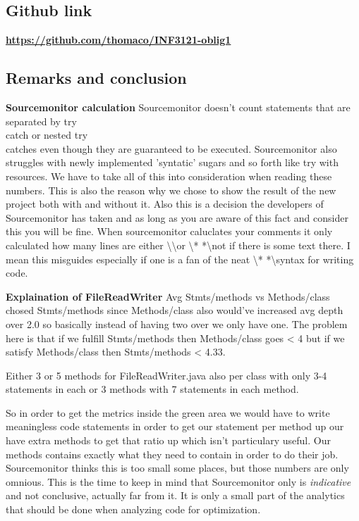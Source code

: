 \documentclass{article}
\begin{document}
\subsection{Github link}
\href{https://github.com/thomaco/INF3121-oblig1}{\textbf{https://github.com/thomaco/INF3121-oblig1}}

\subsection{Remarks and conclusion}%
\textbf{Sourcemonitor calculation\newline}
Sourcemonitor doesn't count statements that are separated
by try\\catch or nested try\\catches even though they are guaranteed to be
executed. 
Sourcemonitor also struggles with newly implemented 'syntatic' sugars and so forth like
try with resources. We have to take all of this into consideration when reading these numbers.
This is also the reason why we chose to show the result of the new project both with and without it.
Also this is a decision the developers of Sourcemonitor has taken and as long as you are aware of this fact and consider this you will be fine. \newline
When sourcemonitor caluclates your comments it only calculated how many lines are either \textbackslash \textbackslash or \textbackslash* * *\textbackslash not if there is some text there. I mean this misguides especially if one is a fan of the neat \textbackslash* * *\textbackslash syntax for writing code.


\textbf{Explaination of FileReadWriter\newline}
Avg Stmts/methods vs Methods/class
chosed Stmts/methods since Methods/class
also would've increased avg depth over 2.0
so basically instead of having two over we only have one.
The problem here is that if we fulfill Stmts/methods then Methods/class
goes < 4 but if we satisfy Methods/class then Stmts/methods < 4.33.

Either 3 or 5 methods for FileReadWriter.java also per class
with only 3-4 statements in each or 3 methods with 7 statements
in each method. 

So in order to get the metrics inside the green area we would have to
write meaningless code statements in order to get our statement per method up
our have extra methods to get that ratio up which isn't particulary useful. Our
methods contains exactly what they need to contain in order to do their job. Sourcemonitor
thinks this is too small some places, but those numbers are only omnious. 
This is the time to keep in mind that Sourcemonitor only is \textit{indicative}
and not conclusive, actually far from it. It is only a small part of the analytics
that should be done when analyzing code for optimization. 

\end{document}
